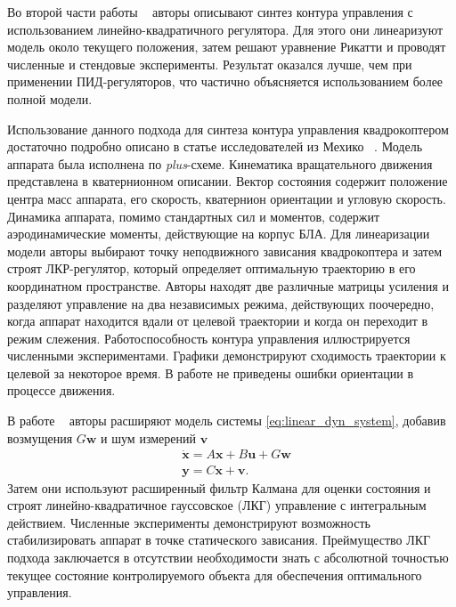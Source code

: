 Во второй части работы ~\cite{Bouabdallah01} авторы описывают синтез контура управления с использованием линейно-квадратичного регулятора. Для этого они линеаризуют модель около текущего положения, затем решают уравнение Рикатти и проводят численные и стендовые эксперименты. Результат оказался лучше, чем при применении ПИД-регуляторов, что частично объясняется использованием более полной модели.


Использование данного подхода для синтеза контура управления квадрокоптером достаточно подробно описано в статье исследователей из Мехико ~\cite{Reyes-Valeria01}. Модель аппарата была исполнена по \textit{plus}-схеме. Кинематика вращательного движения представлена в кватернионном описании. Вектор состояния содержит положение центра масс аппарата, его скорость, кватернион ориентации и угловую скорость. Динамика аппарата, помимо стандартных сил и моментов, содержит аэродинамические моменты, действующие на корпус БЛА. Для линеаризации модели авторы выбирают точку неподвижного зависания квадрокоптера и затем строят ЛКР-регулятор, который определяет оптимальную траекторию в его координатном пространстве. Авторы находят две различные матрицы усиления и разделяют управление на два независимых режима, действующих поочередно, когда аппарат находится вдали от целевой траектории и когда он переходит в режим слежения. Работоспособность контура управления иллюстрируется численными экспериментами. Графики демонстрируют сходимость траектории к целевой за некоторое время. В работе не приведены ошибки ориентации в процессе движения.

В работе ~\cite{Minh01} авторы расширяют модель системы \eqref{eq:linear_dyn_system}, добавив возмущения $G \bm{w}$ и шум измерений $\bm{v}$
\begin{equation} \label{eq:linear_dyn_system_noisy}
\begin{aligned}
&\dot{\bm{x}} = A\bm{x} + B\bm{u} + G \bm{w}\\
&\bm{y} = C \bm{x} + \bm{v}.
\end{aligned}
\end{equation}
Затем они используют расширенный фильтр Калмана для оценки состояния и строят линейно-квадратичное гауссовское (ЛКГ) управление с интегральным действием. Численные эксперименты демонстрируют возможность стабилизировать аппарат в точке статического зависания. Преймущество ЛКГ подхода заключается в отсутствии необходимости знать с абсолютной точностью текущее состояние контролируемого объекта для обеспечения оптимального управления.

